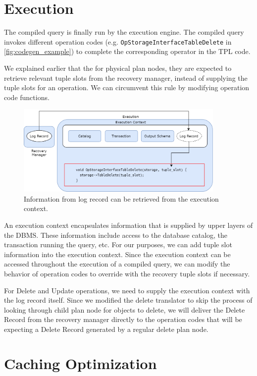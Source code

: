 \documentclass[12pt]{cmuthesis}
\begin{document}
\section{Execution}
The compiled query is finally run by the execution engine. The compiled query invokes different operation codes (e.g. \texttt{OpStorageInterfaceTableDelete} in \ref{fig:codegen_example}) to complete the corresponding operator in the TPL code.


We explained earlier that the for physical plan nodes, they are expected to retrieve relevant tuple slots from the recovery manager, instead of supplying the tuple slots for an operation. We can circumvent this rule by modifying operation code functions.

\begin{figure}[H]
\centering
\includegraphics[width=0.9\textwidth]{images/RecoveryExecution.png}
\caption{Information from log record can be retrieved from the execution context.}
\label{fig:recovery_execution}
\end{figure}

An execution context encapsulates information that is supplied by upper layers of the DBMS. These information include access to the database catalog, the transaction running the query, etc. For our purposes, we can add tuple slot information into the execution context. Since the execution context can be accessed throughout the execution of a compiled query, we can modify the behavior of operation codes to override with the recovery tuple slots if necessary.

For Delete and Update operations, we need to supply the execution context with the log record itself. Since we modified the delete translator to skip the process of looking through child plan node for objects to delete, we will deliver the Delete Record from the recovery manager directly to the operation codes that will be expecting a Delete Record generated by a regular delete plan node.

\section{Caching Optimization}
\end{document}
